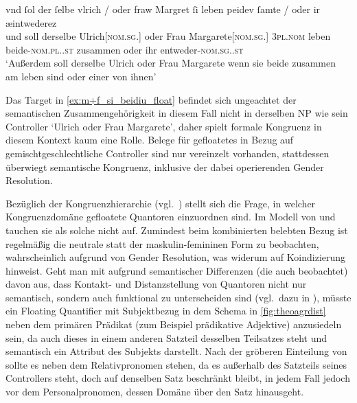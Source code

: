 \begin{exe}
\ex \label{ex:m+f_si_beidiu_float}
	\gll vnd ſol {der ſelbe} vlrich / oder fraw Margret \textelp{}
			ſi leben peidev ſamte / oder ir æintwederez \\
		und soll derselbe Ulrich[\textsc{nom.sg.\MascM}] {} oder Frau
			Margarete[\textsc{nom.sg.\FemF}] {} \textsc{3pl\subMF.nom} leben
			beide-\textsc{nom.pl.\NeutMF.st} zusammen {} oder ihr
			entweder-\textsc{nom.sg.\NeutMF.st} \\
	\trans `Außerdem soll derselbe Ulrich oder Frau Margarete \textelp{}
		wenn sie beide zusammen am leben sind oder einer von ihnen'
		\parencites(Nr.~3141~A, Brixen, 1298)[352,3--9]{cao4}
\end{exe}

Das Target  in \cref{ex:m+f_si_beidiu_float} befindet sich
ungeachtet der semantischen Zusammengehörigkeit in diesem Fall nicht in
derselben NP wie sein Controller  `Ulrich oder
Frau Margarete', daher spielt formale Kongruenz in diesem Kontext kaum eine
Rolle. Belege für gefloatetes  in Bezug auf gemischtgeschlechtliche
Controller sind nur vereinzelt vorhanden, stattdessen überwiegt semantische
Kongruenz, inklusive der dabei operierenden Gender Resolution.

Bezüglich der Kongruenzhierarchie (vgl.~) stellt sich die
Frage, in welcher Kongruenzdomäne gefloatete Quantoren einzuordnen sind. Im
Modell von \citet{corbett1979} und \citet[84]{wechslerzlatic2003} tauchen sie
als solche nicht auf. Zumindest beim kombinierten belebten Bezug ist regelmäßig
die neutrale statt der maskulin-femininen Form zu beobachten, wahrscheinlich
aufgrund von Gender Resolution, was widerum auf Koindizierung hinweist. Geht
man mit \citet{spector2009} aufgrund semantischer Differenzen (die auch
\cite{pittner1995} beobachtet) davon aus, dass Kontakt- und Distanzstellung von
Quantoren nicht nur semantisch, sondern auch funktional zu unterscheiden sind
(vgl.~dazu in ), müsste ein Floating Quantifier mit
Subjektbezug in dem Schema in \cref{fig:theoagrdist} neben dem primären
Prädikat (zum Beispiel prädikative Adjektive) anzusiedeln sein, da auch dieses
in einem anderen Satzteil desselben Teilsatzes steht und semantisch ein
Attribut des Subjekts darstellt. Nach der gröberen Einteilung von
\citet[216]{corbett1979} sollte es neben dem Relativpronomen stehen, da es
außerhalb des Satzteils seines Controllers steht, doch auf denselben Satz
beschränkt bleibt, in jedem Fall jedoch vor dem Personalpronomen, dessen Domäne
über den Satz hinausgeht.%

